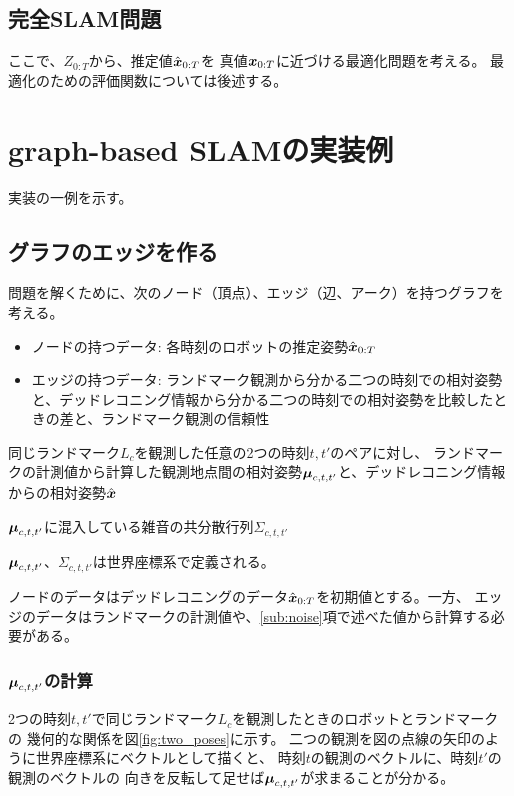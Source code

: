 \subsection{完全SLAM問題}

ここで、$Z_{0:T}$から、推定値$\hat{\boldsymbol{x}}_{0:T}$を
真値$\boldsymbol{x}_{0:T}$に近づける最適化問題を考える。
最適化のための評価関数については後述する。

\section{graph-based SLAMの実装例}

実装の一例を示す。

\subsection{グラフのエッジを作る}

問題を解くために、次のノード（頂点）、エッジ（辺、アーク）を持つグラフを考える。
\begin{itemize}
	\item ノードの持つデータ: 各時刻のロボットの推定姿勢$\hat{\boldsymbol{x}}_{0:T}$
	\item エッジの持つデータ: ランドマーク観測から分かる二つの時刻での相対姿勢と、デッドレコニング情報から分かる二つの時刻での相対姿勢を比較したときの差と、ランドマーク観測の信頼性
\end{itemize}

同じランドマーク$L_c$を観測した任意の2つの時刻$t,t'$のペアに対し、
		ランドマークの計測値から計算した観測地点間の相対姿勢$\boldsymbol{\mu}_{c,t,t'}$と、デッドレコニング情報からの相対姿勢$\hat{\boldsymbol{x}}$
		
		
		$\boldsymbol{\mu}_{c,t,t'}$に混入している雑音の共分散行列$\Sigma_{c,t,t'}$
		
$\boldsymbol{\mu}_{c,t,t'}$、$\Sigma_{c,t,t'}$は世界座標系で定義される。

ノードのデータはデッドレコニングのデータ$\hat{\boldsymbol{x}}_{0:T}$を初期値とする。一方、
エッジのデータはランドマークの計測値や、\ref{sub:noise}項で述べた値から計算する必要がある。

\subsubsection{$\boldsymbol{\mu}_{c,t,t'}$の計算}

2つの時刻$t,t'$で同じランドマーク$L_c$を観測したときのロボットとランドマークの
幾何的な関係を図\ref{fig:two_poses}に示す。
二つの観測を図の点線の矢印のように世界座標系にベクトルとして描くと、
時刻$t$の観測のベクトルに、時刻$t'$の観測のベクトルの
向きを反転して足せば$\boldsymbol{\mu}_{c,t,t'}$が求まることが分かる。


